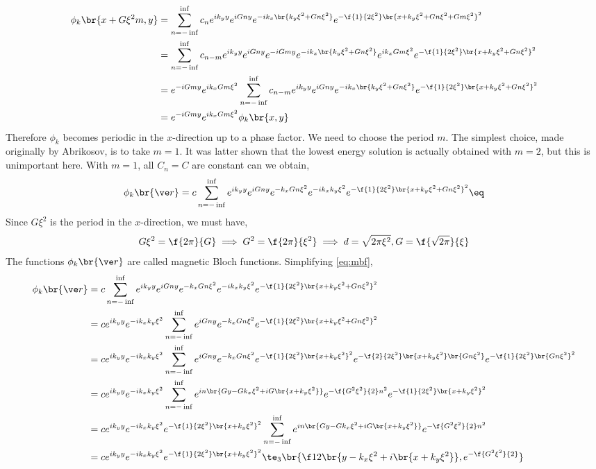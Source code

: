 \documentclass{article}
\begin{document}
\begin{align*}
\phi_k\br{x + G \xi^2 m, y}
&= \sum_{n=-\inf}^{\inf} c_n e^{ik_y y}e^{i Gn y}e^{-ik_x\br{k_y \xi^2 + G n \xi^2}} e^{-\f{1}{2 \xi^2} \br{x + k_y \xi^2 + G n \xi^2 + G m\xi^2}^2} \\
&= \sum_{n=-\inf}^{\inf} c_{n-m} e^{ik_y y}e^{i Gn y}e^{-i Gm y}e^{-ik_x\br{k_y \xi^2 + G n \xi^2}}e^{ik_xGm\xi^2} e^{-\f{1}{2 \xi^2} \br{x + k_y \xi^2 + G n \xi^2}^2} \\
&= e^{-i Gm y}e^{ik_xGm\xi^2}\sum_{n=-\inf}^{\inf} c_{n-m} e^{ik_y y}e^{i Gn y}e^{-ik_x\br{k_y \xi^2 + G n \xi^2}} e^{-\f{1}{2 \xi^2} \br{x + k_y \xi^2 + G n \xi^2}^2} \\
&= e^{-i Gm y}e^{ik_xGm\xi^2}\phi_k\br{x,y}
\end{align*}
Therefore $\phi_k$ becomes periodic in the $x$-direction up to a phase factor. We need to choose the period $m$. The simplest choice, made originally by Abrikosov, is to take $m = 1$. It was latter shown that the lowest energy solution is actually obtained with $m=2$, but this is unimportant here. With $m = 1$, all $C_n = C$ are constant can we obtain,
\[ \phi_k\br{\ve r} = c \sum_{n=-\inf}^{\inf} e^{ik_y y}e^{iGny} e^{-k_x G n\xi^2}e^{-ik_x k_y\xi^2}e^{-\f{1}{2\xi^2}\br{x + k_y\xi^2 + Gn\xi^2}^2} \eq \label{eq:mbf}\]
Since $G\xi^2$ is the period in the $x$-direction, we must have,
\[ G \xi^2 = \f{2\pi}{G} \implies G^2 = \f{2\pi}{\xi^2} \implies d = \sqrt{2\pi \xi^2}, G = \f{\sqrt{2\pi}}{\xi} \]
The functions $\phi_k\br{\ve r}$ are called magnetic Bloch functions. Simplifying \cref{eq:mbf},
\begin{align*}
\phi_k\br{\ve r}
&= c \sum_{n=-\inf}^{\inf} e^{ik_y y}e^{iGny} e^{-k_x G n\xi^2}e^{-ik_x k_y\xi^2}e^{-\f{1}{2\xi^2}\br{x + k_y\xi^2 + Gn\xi^2}^2} \\
&= c e^{ik_y y}e^{-ik_x k_y\xi^2} \sum_{n=-\inf}^{\inf}e^{iGny} e^{-k_x G n\xi^2}e^{-\f{1}{2\xi^2}\br{x + k_y\xi^2 + Gn\xi^2}^2} \\
&= c e^{ik_y y}e^{-ik_x k_y\xi^2} \sum_{n=-\inf}^{\inf}e^{iGny} e^{-k_x G n\xi^2}e^{-\f{1}{2\xi^2}\br{x + k_y\xi^2}^2}e^{-\f{2}{2\xi^2}\br{x + k_y\xi^2}\br{Gn\xi^2}}e^{-\f{1}{2\xi^2}\br{Gn\xi^2}^2} \\
&= c e^{ik_y y}e^{-ik_x k_y\xi^2} \sum_{n=-\inf}^{\inf}e^{in\br{Gy - Gk_x\xi^2 + i G\br{x+k_y\xi^2}}} e^{-\f{G^2\xi^2}{2}n^2}e^{-\f{1}{2\xi^2}\br{x + k_y\xi^2}^2} \\
&= c e^{ik_y y}e^{-ik_x k_y\xi^2}e^{-\f{1}{2\xi^2}\br{x + k_y\xi^2}^2} \sum_{n=-\inf}^{\inf}e^{in\br{Gy - Gk_x\xi^2 + i G\br{x+k_y\xi^2}}} e^{-\f{G^2\xi^2}{2}n^2} \\
&= c e^{ik_y y}e^{-ik_x k_y\xi^2}e^{-\f{1}{2\xi^2}\br{x + k_y\xi^2}^2} \te_{3}\br{\f12\br{y - k_x\xi^2 + i \br{x+k_y\xi^2}}, e^{-\f{G^2 \xi^2}{2}}}
\end{align*}
\end{document}
